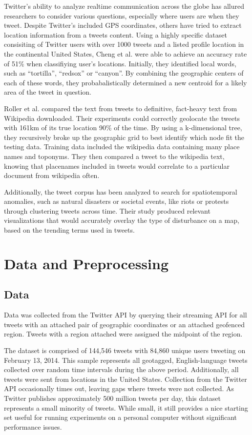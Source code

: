 \documentclass[midd]{thesis}
\begin{document}
Twitter's ability to analyze realtime communication across the globe has allured researchers to consider various questions, especially where users are when they tweet. Despite Twitter's included GPS coordinates, others have tried to extract location information from a tweets content. Using a highly specific dataset consisiting of Twitter users with over 1000 tweets and a listed profile location in the continental United States, Cheng et al. \cite{cheng2010you} were able to achieve an accuracy rate of 51\% when classifiying user's locations. Initially, they identified local words, such as ``tortilla'', ``redsox'' or ``canyon''. By combining the geographic centers of each of these words, they probabalistically determined a new centroid for a likely area of the tweet in question. 

Roller et al. \cite{roller2012supervised} compared the text from tweets to definitive, fact-heavy text from Wikipedia downloaded. Their experiments could correctly geolocate the tweets with 161km of its true location 90\% of the time. By using a k-dimensional tree, they recursively broke up the geographic grid to best identify which node fit the testing data. Training data included the wikipedia data containing many place names and toponyms. They then compared a tweet to the wikipedia text, knowing that placenames included in tweets would correlate to a particular document from wikipedia often.

Additionally, the tweet corpus has been analyzed to search for spatiotemporal anomalies, such as natural disasters or societal events, like riots or protests through clustering tweets across time. Their study produced relevant visualizations that would accurately overlay the type of disturbance on a map, based on the trending terms used in tweets. \cite{thom2012spatiotemporal} 


\chapter{Data and Preprocessing}
\section{Data}

Data was collected from the Twitter API by querying their streaming API for all tweets with an attached pair of geographic coordinates or an attached geofenced region. Tweets with a region attached were assigned the midpoint of the region. 

The dataset is comprised of 144,546 tweets with 84,860 unique users tweeting on February 13, 2014. This sample represents all geotagged, English-language tweets collected over random time intervals during the above period. Additionally, all tweets were sent from locations in the United States. Collection from the Twitter API occasionally times out, leaving gaps where tweets were not collected. As Twitter publishes approximately 500 million tweets per day\cite{twitterabout}, this dataset represents a small minority of tweets. While small, it still provides a nice starting set useful for running experiments on a personal computer without significant performance issues.
\end{document}
